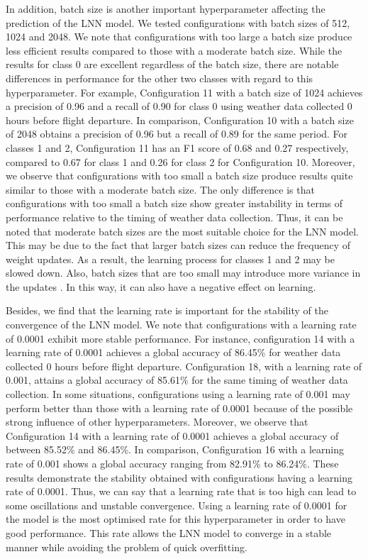 \documentclass[12pt,oneside]{book} %
\begin{document}
\noindent In addition, batch size is another important hyperparameter affecting the prediction of the LNN model. We tested configurations with batch sizes of 512, 1024 and 2048. We note that configurations with too large a batch size produce less efficient results compared to those with a moderate batch size. While the results for class 0 are excellent regardless of the batch size, there are notable differences in performance for the other two classes with regard to this hyperparameter. For example, Configuration 11 with a batch size of 1024 achieves a precision of 0.96 and a recall of 0.90 for class 0 using weather data collected 0 hours before flight departure. In comparison, Configuration 10 with a batch size of 2048 obtains a precision of 0.96 but a recall of 0.89 for the same period. For classes 1 and 2, Configuration 11 has an F1 score of 0.68 and 0.27 respectively, compared to 0.67 for class 1 and 0.26 for class 2 for Configuration 10. Moreover, we observe that configurations with too small a batch size produce results quite similar to those with a moderate batch size. The only difference is that configurations with too small a batch size show greater instability in terms of performance relative to the timing of weather data collection. Thus, it can be noted that moderate batch sizes are the most suitable choice for the LNN model. This may be due to the fact that larger batch sizes can reduce the frequency of weight updates. As a result, the learning process for classes 1 and 2 may be slowed down. Also, batch sizes that are too small may introduce more variance in the updates \cite{Epochs_batch2}. In this way, it can also have a negative effect on learning.

\noindent Besides, we find that the learning rate is important for the stability of the convergence of the LNN model. We note that configurations with a learning rate of 0.0001 exhibit more stable performance. For instance, configuration 14 with a learning rate of 0.0001 achieves a global accuracy of 86.45\% for weather data collected 0 hours before flight departure. Configuration 18, with a learning rate of 0.001, attains a global accuracy of 85.61\% for the same timing of weather data collection. In some situations, configurations using a learning rate of 0.001 may perform better than those with a learning rate of 0.0001 because of the possible strong influence of other hyperparameters. Moreover, we observe that Configuration 14 with a learning rate of 0.0001 achieves a global accuracy of between 85.52\% and 86.45\%. In comparison, Configuration 16 with a learning rate of 0.001 shows a global accuracy ranging from 82.91\% to 86.24\%. These results demonstrate the stability obtained with configurations having a learning rate of 0.0001. Thus, we can say that a learning rate that is too high can lead to some oscillations and unstable convergence. Using a learning rate of 0.0001 for the model is the most optimised rate for this hyperparameter in order to have good performance. This rate allows the LNN model to converge in a stable manner while avoiding the problem of quick overfitting.
\end{document}
